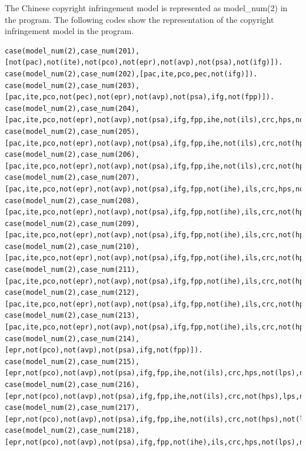 \documentclass{IOS-Book-Article}
\begin{document}
The Chinese copyright infringement model is represented as {\mf model\_num(2)} in the program. The following codes show the representation of the copyright infringement model in the program.
\begin{lstlisting}
case(model_num(2),case_num(201),[not(pac),not(ite),not(pco),not(epr),not(avp),not(psa),not(ifg)]).
case(model_num(2),case_num(202),[pac,ite,pco,pec,not(ifg)]).
case(model_num(2),case_num(203),[pac,ite,pco,not(pec),not(epr),not(avp),not(psa),ifg,not(fpp)]).
case(model_num(2),case_num(204),[pac,ite,pco,not(epr),not(avp),not(psa),ifg,fpp,ihe,not(ils),crc,hps,not(lps),not(m3fti),not(l3fti),not(cdt),not(fin)]).
case(model_num(2),case_num(205),[pac,ite,pco,not(epr),not(avp),not(psa),ifg,fpp,ihe,not(ils),crc,not(hps),lps,not(m3fti),not(l3fti),not(cdt),not(fin)]).
case(model_num(2),case_num(206),[pac,ite,pco,not(epr),not(avp),not(psa),ifg,fpp,ihe,not(ils),crc,not(hps),not(lps),m3fti,not(l3fti),not(cdt),fin]).
case(model_num(2),case_num(207),[pac,ite,pco,not(epr),not(avp),not(psa),ifg,fpp,not(ihe),ils,crc,hps,not(lps),not(m3fti),not(l3fti),not(cdt),not(fin)]).
case(model_num(2),case_num(208),[pac,ite,pco,not(epr),not(avp),not(psa),ifg,fpp,not(ihe),ils,crc,not(hps),lps,not(m3fti),not(l3fti),not(cdt),not(fin)]).
case(model_num(2),case_num(209),[pac,ite,pco,not(epr),not(avp),not(psa),ifg,fpp,not(ihe),ils,crc,not(hps),not(lps),not(m3fti),not(l3fti),not(cdt),fin]).
case(model_num(2),case_num(210),[pac,ite,pco,not(epr),not(avp),not(psa),ifg,fpp,not(ihe),ils,crc,not(hps),not(lps),not(m3fti),l3fti,not(cdt),fin,cpb,pbt]).
case(model_num(2),case_num(211),[pac,ite,pco,not(epr),not(avp),not(psa),ifg,fpp,not(ihe),ils,crc,not(hps),not(lps),not(m3fti),not(l3fti),cdt,fin,cpb,pbt]).
case(model_num(2),case_num(212),[pac,ite,pco,not(epr),not(avp),not(psa),ifg,fpp,not(ihe),ils,crc,not(hps),not(lps),not(m3fti),l3fti,not(cdt),fin,not(cpb),not(pbt)]).
case(model_num(2),case_num(213),[pac,ite,pco,not(epr),not(avp),not(psa),ifg,fpp,not(ihe),ils,crc,not(hps),not(lps),not(m3fti),not(l3fti),cdt,fin,not(cpb),not(pbt)]).
case(model_num(2),case_num(214),[epr,not(pco),not(avp),not(psa),ifg,not(fpp)]).
case(model_num(2),case_num(215),[epr,not(pco),not(avp),not(psa),ifg,fpp,ihe,not(ils),crc,hps,not(lps),not(m3fti),not(l3fti),not(cdt),not(fin)]).
case(model_num(2),case_num(216),[epr,not(pco),not(avp),not(psa),ifg,fpp,ihe,not(ils),crc,not(hps),lps,not(m3fti),not(l3fti),not(cdt),not(fin)]).
case(model_num(2),case_num(217),[epr,not(pco),not(avp),not(psa),ifg,fpp,ihe,not(ils),crc,not(hps),not(lps),m3fti,not(l3fti),not(cdt),fin]).
case(model_num(2),case_num(218),[epr,not(pco),not(avp),not(psa),ifg,fpp,not(ihe),ils,crc,hps,not(lps),not(m3fti),not(l3fti),not(cdt),not(fin)]).

\end{lstlisting}
\end{document}
